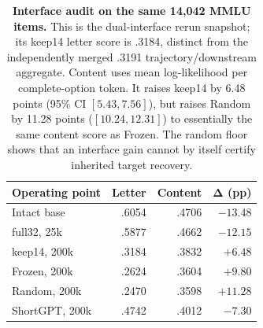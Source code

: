 \begin{table}[t]
\centering
\scriptsize
\setlength{\tabcolsep}{3.2pt}
\begin{tabular}{@{}lrrr@{}}
\toprule
\textbf{Operating point} & \textbf{Letter} & \textbf{Content} &
$\boldsymbol{\Delta}$ \textbf{(pp)} \\
\midrule
Intact base & .6054 & .4706 & $-13.48$ \\
full32, 25k & .5877 & .4662 & $-12.15$ \\
keep14, 200k & .3184 & .3832 & $+6.48$ \\
Frozen, 200k & .2624 & .3604 & $+9.80$ \\
Random, 200k & .2470 & .3598 & $+11.28$ \\
ShortGPT, 200k & .4742 & .4012 & $-7.30$ \\
\bottomrule
\end{tabular}
\caption{\textbf{Interface audit on the same 14,042 MMLU items.} This is the
dual-interface rerun snapshot; its keep14 letter score is .3184, distinct from
the independently merged .3191 trajectory/downstream aggregate.
Content uses
mean log-likelihood per complete-option token. It raises keep14 by 6.48 points
(95\% CI $[5.43,7.56]$), but raises Random by 11.28 points
($[10.24,12.31]$) to essentially the same content score as Frozen. The random
floor shows that an interface gain cannot by itself certify inherited target
recovery.}
\label{tab:interface-audit}
\end{table}
